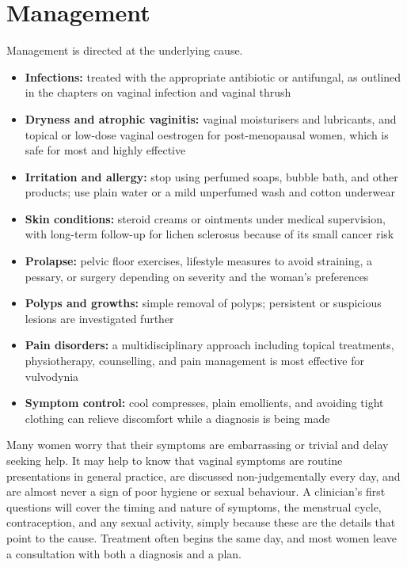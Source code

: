 \section*{Management}
Management is directed at the underlying cause.

\begin{itemize}
    \item \textbf{Infections:} treated with the appropriate antibiotic or antifungal, as outlined in the chapters on vaginal infection and vaginal thrush
    \item \textbf{Dryness and atrophic vaginitis:} vaginal moisturisers and lubricants, and topical or low-dose vaginal oestrogen for post-menopausal women, which is safe for most and highly effective
    \item \textbf{Irritation and allergy:} stop using perfumed soaps, bubble bath, and other products; use plain water or a mild unperfumed wash and cotton underwear
    \item \textbf{Skin conditions:} steroid creams or ointments under medical supervision, with long-term follow-up for lichen sclerosus because of its small cancer risk
    \item \textbf{Prolapse:} pelvic floor exercises, lifestyle measures to avoid straining, a pessary, or surgery depending on severity and the woman's preferences
    \item \textbf{Polyps and growths:} simple removal of polyps; persistent or suspicious lesions are investigated further
    \item \textbf{Pain disorders:} a multidisciplinary approach including topical treatments, physiotherapy, counselling, and pain management is most effective for vulvodynia
    \item \textbf{Symptom control:} cool compresses, plain emollients, and avoiding tight clothing can relieve discomfort while a diagnosis is being made
\end{itemize}

Many women worry that their symptoms are embarrassing or trivial and delay seeking help. It may help to know that vaginal symptoms are routine presentations in general practice, are discussed non-judgementally every day, and are almost never a sign of poor hygiene or sexual behaviour. A clinician's first questions will cover the timing and nature of symptoms, the menstrual cycle, contraception, and any sexual activity, simply because these are the details that point to the cause. Treatment often begins the same day, and most women leave a consultation with both a diagnosis and a plan.

